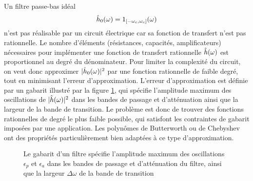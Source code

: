 Un filtre 
passe-bas id\'eal 
\[
\hat h_0 ({\omega}) = 1_{[-{\omega}_c,{\omega}_c]} ({\omega})
\] 
n'est pas r\'ealisable
par un circuit \'electrique car sa fonction de transfert
n'est pas rationnelle. 
Le nombre d'\'el\'ements (r\'esistances, capacit\'es,
amplificateurs) n\'ecessaires pour impl\'ementer 
une fonction de transfert rationnelle $\hat h({\omega})$ est
proportionnel au degr\'e du d\'enominateur.
Pour limiter la complexit\'e
du circuit, on veut donc
approximer $|\hat h_0 ({\omega})|^2$ par une
fonction rationnelle de faible degr\'e, tout en minimisant l'erreur
d'approximation. 
L'erreur
d'approximation est d\'efinie par un gabarit illustr\'e
par la figure \ref{gabarit}, qui sp\'ecifie 
l'amplitude maximum des oscillations de
$|\hat h({\omega})|^2$ dans les bandes de passage et d'att\'enuation
ainsi que la largeur de la bande de transition.
Le probl\`eme est donc de trouver des fonctions rationnelles
de degr\'e le plus faible possible, qui satisfont les
contraintes de gabarit impos\'ees par une application.
Les polyn\^omes de Butterworth ou de Chebyshev ont des
propri\'et\'es particuli\`erement bien adapt\'ees \`a ce type 
d'approximation.

\begin{figure}[bhtp]
\centerline{
	\leavevmode{}}
\caption{Le gabarit d'un filtre sp\'ecifie
l'amplitude maximum des oscillations $\epsilon_p $ et $\epsilon_a $
dans les bandes de passage et d'att\'enuation du filtre, ainsi que
la largeur $\Delta \omega$ de la bande de transition}
\label{gabarit}
\end{figure}

